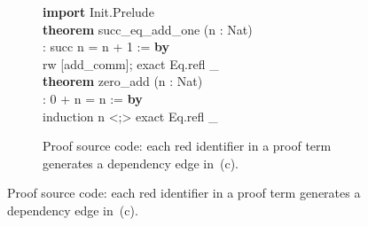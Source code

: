 \begin{figure}[!htb]
\begin{subfigure}[t]{0.60\textwidth}
\textbf{import} \textcolor{blue!60!black}{Init.Prelude}\\[3pt]
\textbf{theorem} \textcolor{red!70!black}{succ\_eq\_add\_one} (n : Nat)\\
\hspace{1.5em}: succ n = n + 1 := \textbf{by}\\
\hspace{1.5em}rw [\textcolor{red!70!black}{add\_comm}]; exact \textcolor{red!70!black}{Eq.refl} \_\\[3pt]
\textbf{theorem} \textcolor{red!70!black}{zero\_add} (n : Nat)\\
\hspace{1.5em}: 0 + n = n := \textbf{by}\\
\hspace{1.5em}induction n <;> exact \textcolor{red!70!black}{Eq.refl} \_
\caption{Proof source code: each \textcolor{red!70!black}{red identifier} in a proof term generates a dependency edge in~(c).}
\label{fig:source-view}
\end{subfigure}

\par\vspace{4pt}


\end{figure}
